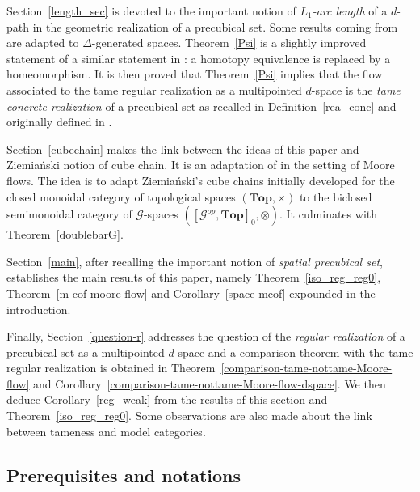 \documentclass[a4paper,12pt]{amsart}
\newcommand{\p}{\times}
\theoremstyle{definition}
\renewcommand{\top}{{\mathbf{Top}}}
\newcommand{\ot}{\otimes}
\newcommand{\topdgr}{[\mathcal{G}^{op},\top]}
\begin{document}
Section~\ref{length_sec} is devoted to the important notion of \textit{$L_1$-arc length} of a $d$-path in the geometric realization of a precubical set. Some results coming from \cite{MR2521708} are adapted to $\Delta$-generated spaces. Theorem~\ref{Psi} is a slightly improved statement of a similar statement in \cite{MR2521708}: a homotopy equivalence is replaced by a homeomorphism. It is then proved that Theorem~\ref{Psi} implies that the flow associated to the tame regular realization as a multipointed $d$-space is the \textit{tame concrete realization} of a precubical set as recalled in Definition~\ref{rea_conc} and originally defined in \cite[Definition~7.1]{NaturalRealization}. 

Section~\ref{cubechain} makes the link between the ideas of this paper and Ziemia{\'{n}}ski notion of cube chain. It is an adaptation of \cite[Section~6]{NaturalRealization} in the setting of Moore flows. The idea is to adapt Ziemia{\'{n}}ski's cube chains initially developed for the closed monoidal category of topological spaces $(\top,\p)$ to the biclosed semimonoidal category of $\mathcal{G}$-spaces $(\topdgr_0,\ot)$. It culminates with Theorem~\ref{doublebarG}. 

Section~\ref{main}, after recalling the important notion of \textit{spatial precubical set}, establishes the main results of this paper, namely Theorem~\ref{iso_reg_reg0}, Theorem~\ref{m-cof-moore-flow} and Corollary~\ref{space-mcof} expounded in the introduction. 

Finally, Section~\ref{question-r} addresses the question of the \textit{regular realization} of a precubical set as a multipointed $d$-space and a comparison theorem with the tame regular realization is obtained in Theorem~\ref{comparison-tame-nottame-Moore-flow} and Corollary~\ref{comparison-tame-nottame-Moore-flow-dspace}. We then deduce Corollary~\ref{reg_weak} from the results of this section and Theorem~\ref{iso_reg_reg0}. Some observations are also made about the link between tameness and model categories. 


\subsection*{Prerequisites and notations}
\end{document}
